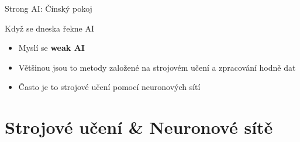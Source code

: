 \documentclass[aspectratio=169,dvipsnames]{beamer}
\begin{document}
\begin{frame}{Strong AI: Čínský pokoj}

\end{frame}


\begin{frame}{Když se dneska řekne AI}

    \Large

    \begin{itemize}

        \item Myslí se \textbf{weak AI}

        \item Většinou jsou to metody založené na strojovém učení a zpracování
            hodně dat

        \item Často je to strojové učení pomocí neuronových sítí

    \end{itemize}


\end{frame}



\section{Strojové učení \& Neuronové sítě}
\end{document}
